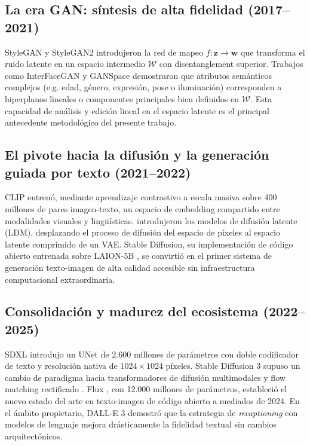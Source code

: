 \documentclass[12pt, a4paper, twoside]{book}
\newcommand{\z}{\mathbf{z}}
\begin{document}
\subsection{La era GAN: síntesis de alta fidelidad (2017--2021)}

StyleGAN \citep{karras2019stylegan} y StyleGAN2 \citep{karras2020stylegan2} introdujeron la red de mapeo $f: \z \rightarrow \mathbf{w}$ que transforma el ruido latente en un espacio intermedio $\mathcal{W}$ con disentanglement superior. Trabajos como InterFaceGAN \citep{shen2020interfacegan} y GANSpace \citep{harkonen2020ganspace} demostraron que atributos semánticos complejos (e.g. edad, género, expresión, pose o iluminación) corresponden a hiperplanos lineales o componentes principales bien definidos en $\mathcal{W}$. Esta capacidad de análisis y edición lineal en el espacio latente es el principal antecedente metodológico del presente trabajo.

\subsection{El pivote hacia la difusión y la generación guiada por texto (2021--2022)}

CLIP \citep{radford2021clip} entrenó, mediante aprendizaje contrastivo a escala masiva sobre 400 millones de pares imagen-texto, un espacio de embedding compartido entre modalidades visuales y lingüísticas. \citet{rombach2022ldm} introdujeron los modelos de difusión latente (LDM), desplazando el proceso de difusión del espacio de píxeles al espacio latente comprimido de un VAE. Stable Diffusion, su implementación de código abierto entrenada sobre LAION-5B \citep{schuhmann2022laion}, se convirtió en el primer sistema de generación texto-imagen de alta calidad accesible sin infraestructura computacional extraordinaria.

\subsection{Consolidación y madurez del ecosistema (2022--2025)}

SDXL \citep{podell2023sdxl} introdujo un UNet de 2.600 millones de parámetros con doble codificador de texto y resolución nativa de $1024 \times 1024$ píxeles. Stable Diffusion 3 \citep{esser2024sd3} supuso un cambio de paradigma hacia transformadores de difusión multimodales y flow matching rectificado \citep{lipman2022flowmatching,liu2022rectified}. Flux \citep{bfl2024flux}, con 12.000 millones de parámetros, estableció el nuevo estado del arte en texto-imagen de código abierto a mediados de 2024. En el ámbito propietario, DALL-E 3 \citep{betker2023dalle3} demostró que la estrategia de \textit{recaptioning} con modelos de lenguaje mejora drásticamente la fidelidad textual sin cambios arquitectónicos.
\end{document}
